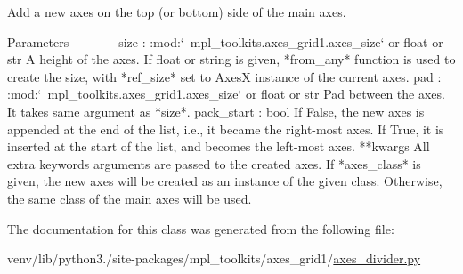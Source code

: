 \begin{DoxyVerb}Add a new axes on the top (or bottom) side of the main axes.

Parameters
----------
size : :mod:`~mpl_toolkits.axes_grid1.axes_size` or float or str
    A height of the axes. If float or string is given, *from_any*
    function is used to create the size, with *ref_size* set to AxesX
    instance of the current axes.
pad : :mod:`~mpl_toolkits.axes_grid1.axes_size` or float or str
    Pad between the axes. It takes same argument as *size*.
pack_start : bool
    If False, the new axes is appended at the end
    of the list, i.e., it became the right-most axes. If True, it is
    inserted at the start of the list, and becomes the left-most axes.
**kwargs
    All extra keywords arguments are passed to the created axes.
    If *axes_class* is given, the new axes will be created as an
    instance of the given class. Otherwise, the same class of the
    main axes will be used.
\end{DoxyVerb}
 

The documentation for this class was generated from the following file\+:\begin{DoxyCompactItemize}
\item 
venv/lib/python3./site-\/packages/mpl\+\_\+toolkits/axes\+\_\+grid1/\hyperlink{axes__grid1_2axes__divider_8py}{axes\+\_\+divider.\+py}\end{DoxyCompactItemize}
